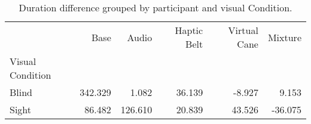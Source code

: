 
\begin{table}[!htb]
\centering
\caption{Duration difference grouped by participant and visual Condition.}
\label{tab:duracao_var_group}
\begin{tabular}{lrrrrr}
\toprule
{} &    Base &   Audio &  Haptic Belt &  Virtual Cane &  Mixture \\
Visual Condition &         &         &              &               &          \\
\midrule
Blind            & 342.329 &   1.082 &       36.139 &        -8.927 &    9.153 \\
Sight            &  86.482 & 126.610 &       20.839 &        43.526 &  -36.075 \\
\bottomrule
\end{tabular}
\end{table}

